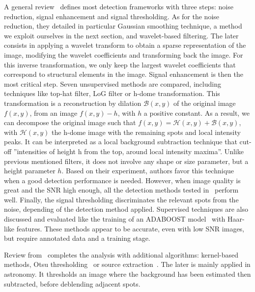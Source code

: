 A general review~\cite{smal_quantitative_2010} defines most detection frameworks with three steps: noise reduction, signal enhancement and signal thresholding.
As for the noise reduction, they detailed in particular Gaussian smoothing technique, a method we exploit ourselves in the next section, and wavelet-based filtering.
The later consists in applying a wavelet transform to obtain a sparse representation of the image, modifying the wavelet coefficients and transforming back the image.
For this inverse transformation, we only keep the largest wavelet coefficients that correspond to structural elements in the image.
Signal enhancement is then the most critical step.
Seven unsupervised methods are compared, including techniques like top-hat filter, \ac{LoG} filter or h-dome transformation.
This transformation is a reconstruction by dilation $\mathcal{B}(x, y)$ of the original image $f(x, y)$, from an image $f(x, y) - h$, with $h$ a positive constant.
As a result, we can decompose the original image such that $f(x, y) = \mathcal{H}(x, y) + \mathcal{B}(x, y)$, with $\mathcal{H}(x, y)$ the h-dome image with the remaining spots and local intensity peaks.
It can be interpreted as a local background subtraction technique that cut-off ''intensities of height h from the top, around local intensity maxima''.
Unlike previous mentioned filters, it does not involve any shape or size parameter, but a height parameter $h$.
Based on their experiment, authors favor this technique when a good detection performance is needed.
However, when image quality is great and the \ac{SNR} high enough, all the detection methods tested in~\cite{smal_quantitative_2010} perform well.
Finally, the signal thresholding discriminates the relevant spots from the noise, depending of the detection method applied.
Supervised techniques are also discussed and evaluated like the training of an ADABOOST model~\cite{FREUND1997119} with Haar-like features.
These methods appear to be accurate, even with low \ac{SNR} images, but require annotated data and a training stage.

Review from~\cite{ruusuvuori_evaluation_2010} completes the analysis with additional algorithms: kernel-based methods, Otsu thresholding~\cite{Otsu_1979} or source extraction~\cite{bertin_sextractor_1996}.
The later is mainly applied in astronomy.
It thresholds an image where the background has been estimated then subtracted, before deblending adjacent spots.

